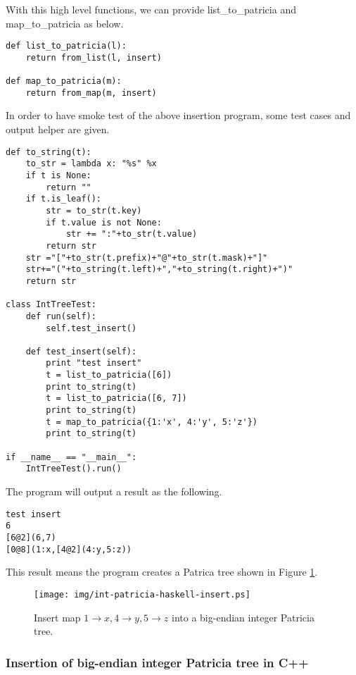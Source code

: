 \documentclass{article}
\begin{document}
With this high level functions, we can provide list\_to\_patricia and
map\_to\_patricia as below.

\begin{lstlisting}
def list_to_patricia(l):
    return from_list(l, insert)

def map_to_patricia(m):
    return from_map(m, insert)
\end{lstlisting}

In order to have smoke test of the above insertion program, some test
cases and output helper are given.

\begin{lstlisting}
def to_string(t):
    to_str = lambda x: "%s" %x
    if t is None:
        return ""
    if t.is_leaf():
        str = to_str(t.key)
        if t.value is not None:
            str += ":"+to_str(t.value)
        return str
    str ="["+to_str(t.prefix)+"@"+to_str(t.mask)+"]"
    str+="("+to_string(t.left)+","+to_string(t.right)+")"
    return str

class IntTreeTest:
    def run(self):
        self.test_insert()

    def test_insert(self):
        print "test insert"
        t = list_to_patricia([6])
        print to_string(t)
        t = list_to_patricia([6, 7])
        print to_string(t)
        t = map_to_patricia({1:'x', 4:'y', 5:'z'})
        print to_string(t)

if __name__ == "__main__":
    IntTreeTest().run()
\end{lstlisting}

The program will output a result as the following.

\begin{verbatim}
test insert
6
[6@2](6,7)
[0@8](1:x,[4@2](4:y,5:z))
\end{verbatim}

This result means the program creates a Patrica tree shown in 
Figure \ref{fig:int-patricia-haskell-insert}.

\begin{figure}[htbp]
       \begin{center}
	\texttt{[image: img/int-patricia-haskell-insert.ps]}
        \caption{Insert map $1 \rightarrow x, 4 \rightarrow y, 5 \rightarrow z$ into a big-endian integer Patricia tree.}
        \label{fig:int-patricia-haskell-insert}
       \end{center}
\end{figure}

\subsubsection*{Insertion of big-endian integer Patricia tree in C++}
\end{document}
